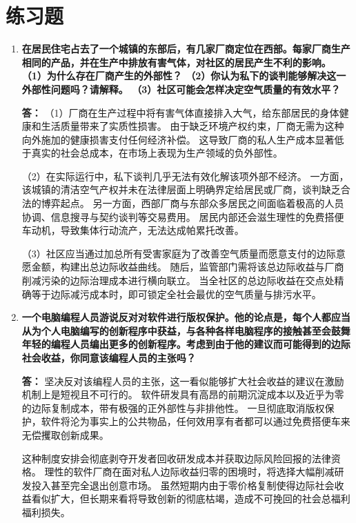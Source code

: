 	\section{练习题}
	\begin{enumerate}[label=\textbf{\arabic*.}, leftmargin=*]
		\item \textbf{在居民住宅占去了一个城镇的东部后，有几家厂商定位在西部。每家厂商生产相同的产品，并在生产中排放有害气体，对社区的居民产生不利的影响。
			（1）为什么存在厂商产生的外部性？
			（2）你认为私下的谈判能够解决这一外部性问题吗？请解释。
			（3）社区可能会怎样决定空气质量的有效水平？}
		
		\textbf{答：} （1）厂商在生产过程中将有害气体直接排入大气，给东部居民的身体健康和生活质量带来了实质性损害。
		由于缺乏环境产权约束，厂商无需为这种向外施加的健康损害支付任何经济补偿。
		这导致厂商的私人生产成本显著低于真实的社会总成本，在市场上表现为生产领域的负外部性。
		
		（2）在实际运行中，私下谈判几乎无法有效化解该项外部不经济。
		一方面，该城镇的清洁空气产权并未在法律层面上明确界定给居民或厂商，谈判缺乏合法的博弈起点。
		另一方面，西部厂商与东部众多居民之间面临着极高的人员协调、信息搜寻与契约谈判等交易费用。
		居民内部还会滋生理性的免费搭便车动机，导致集体行动流产，无法达成帕累托改善。
		
		（3）社区应当通过加总所有受害家庭为了改善空气质量而愿意支付的边际意愿金额，构建出总边际收益曲线。
		随后，监管部门需将该总边际收益与厂商削减污染的边际治理成本进行横向联立。
		当全社区的总边际收益在交点处精确等于边际减污成本时，即可锁定全社会最优的空气质量与排污水平。
		
		\item \textbf{一个电脑编程人员游说反对对软件进行版权保护。他的论点是，每个人都应当从为个人电脑编写的创新程序中获益，与各种各样电脑程序的接触甚至会鼓舞年轻的编程人员编出更多的创新程序。考虑到由于他的建议而可能得到的边际社会收益，你同意该编程人员的主张吗？}
		
		\textbf{答：} 坚决反对该编程人员的主张，这一看似能够扩大社会收益的建议在激励机制上是短视且不可行的。
		软件研发具有高昂的前期沉淀成本以及近乎为零的边际复制成本，带有极强的正外部性与非排他性。
		一旦彻底取消版权保护，软件将沦为事实上的公共物品，任何效用享有者都可以通过免费搭便车来无偿攫取创新成果。
		
		这种制度安排会彻底剥夺开发者回收研发成本并获取边际风险回报的法律资格。
		理性的软件厂商在面对私人边际收益归零的困境时，将选择大幅削减研发投入甚至完全退出创意市场。
		虽然短期内由于零价格复制使得边际社会收益看似扩大，但长期来看将导致创新的彻底枯竭，造成不可挽回的社会总福利福利损失。
		

\end{enumerate}
